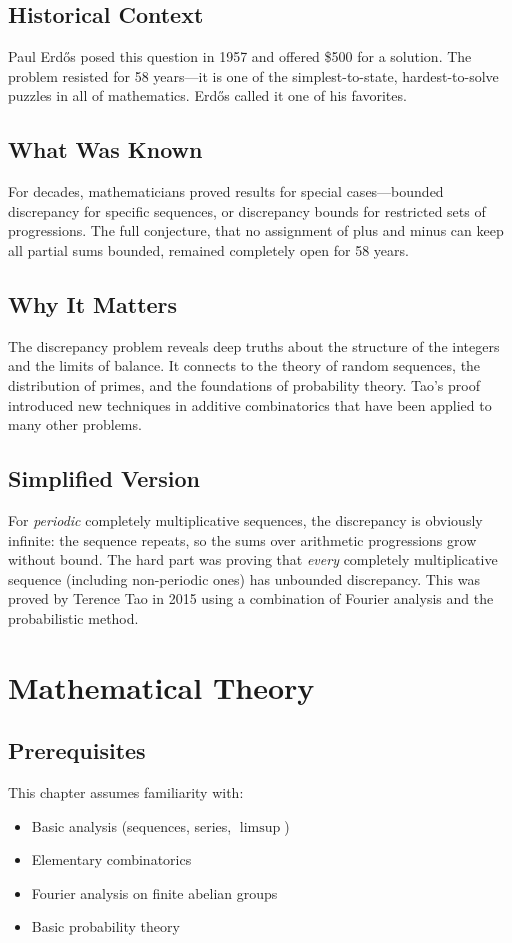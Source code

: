\subsection{Historical Context}
Paul Erdős posed this question in 1957 and offered \$500 for a solution. The problem resisted for 58 years---it is one of the simplest-to-state, hardest-to-solve puzzles in all of mathematics. Erdős called it one of his favorites.

\subsection{What Was Known}
For decades, mathematicians proved results for special cases---bounded discrepancy for specific sequences, or discrepancy bounds for restricted sets of progressions. The full conjecture, that no assignment of plus and minus can keep all partial sums bounded, remained completely open for 58 years.

\subsection{Why It Matters}
The discrepancy problem reveals deep truths about the structure of the integers and the limits of balance. It connects to the theory of random sequences, the distribution of primes, and the foundations of probability theory. Tao's proof introduced new techniques in additive combinatorics that have been applied to many other problems.

\subsection{Simplified Version}
For \emph{periodic} completely multiplicative sequences, the discrepancy is obviously infinite: the sequence repeats, so the sums over arithmetic progressions grow without bound. The hard part was proving that \emph{every} completely multiplicative sequence (including non-periodic ones) has unbounded discrepancy. This was proved by Terence Tao in 2015 using a combination of Fourier analysis and the probabilistic method.

\section{Mathematical Theory}


\subsection{Prerequisites}
This chapter assumes familiarity with:
\begin{itemize}
\item Basic analysis (sequences, series, $\limsup$)
\item Elementary combinatorics
\item Fourier analysis on finite abelian groups
\item Basic probability theory
\end{itemize}

